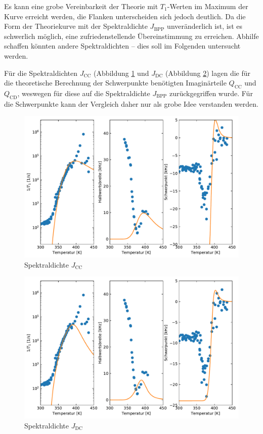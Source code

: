 Es kann eine grobe Vereinbarkeit der Theorie mit $T_1$-Werten im Maximum der Kurve erreicht werden, die Flanken unterscheiden sich jedoch deutlich. Da die Form der Theoriekurve mit der Spektraldichte $J_\text{BPP}$ unveränderlich ist, ist es schwerlich möglich, eine zufriedenstellende Übereinstimmung zu erreichen. Abhilfe schaffen könnten andere Spektraldichten -- dies soll im Folgenden untersucht werden.

Für die Spektraldichten $J_\text{CC}$ (Abbildung \ref{fig:res:theorie_j_cc} und $J_\text{DC}$ (Abbildung \ref{fig:res:theorie_j_dc}) lagen die für die theoretische Berechnung der Schwerpunkte benötigten Imaginärteile $Q_\text{CC}$ und $Q_\text{CD}$, weswegen für diese auf die Spektraldichte $J_\text{BPP}$ zurückgegriffen wurde. Für die Schwerpunkte kann der Vergleich daher nur als grobe Idee verstanden werden.
\begin{figure}
	\begin{center}
		\includegraphics[width=\textwidth]{graphics/plot/OBI_J_cc_01.pdf}
	\end{center}
	\caption{Spektraldichte $J_\text{CC}$} \label{fig:res:theorie_j_cc}
\end{figure}
\begin{figure}
	\begin{center}
		\includegraphics[width=\textwidth]{graphics/plot/OBI_J_dc_01.pdf}
	\end{center}
	\caption{Spektraldichte $J_\text{DC}$} \label{fig:res:theorie_j_dc}
\end{figure}

